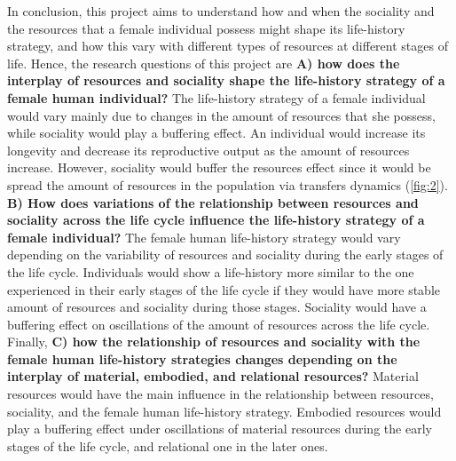 \documentclass{article}
\begin{document}
In conclusion, this project aims to understand how and when the sociality and the resources that a female individual possess might shape its life-history strategy, and how this vary with different types of resources at different stages of life. Hence, the research questions of this project are \textbf{A) how does the interplay of resources and sociality shape the life-history strategy of a female human individual?} The life-history strategy of a female individual would vary mainly due to changes in the amount of resources that she possess, while sociality would play a buffering effect. An individual would increase its longevity and decrease its reproductive output as the amount of resources increase. However, sociality would buffer the resources effect since it would be spread the amount of resources in the population via transfers dynamics (\ref{fig:2}). \textbf{B) How does variations of the relationship between resources and sociality across the life cycle influence the life-history strategy of a female individual?} The female human life-history strategy would vary depending on the variability of resources and sociality during the early stages of the life cycle. Individuals would show a life-history more similar to the one experienced in their early stages of the life cycle if they would have more stable amount of resources and sociality during those stages. Sociality would have a buffering effect on oscillations of the amount of resources across the life cycle. Finally, \textbf{C) how the relationship of resources and sociality with the female human life-history strategies changes depending on the interplay of material, embodied, and relational resources?} Material resources would have the main influence in the relationship between resources, sociality, and the female human life-history strategy. Embodied resources would play a buffering effect under oscillations of material resources during the early stages of the life cycle, and relational one in the later ones.
\end{document}
